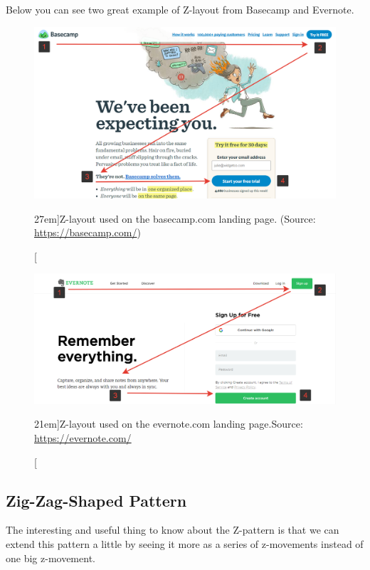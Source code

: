 	Below you can see two great example of Z-layout from Basecamp and Evernote.
	
\begin{figure}%
	\centering
  \includegraphics[width=1.5\textwidth]{../figures/z-shape_basecamp.png}
  \caption[][27em]{Z-layout used on the basecamp.com landing page. (Source: \url{https://basecamp.com/})}
  \label{fig:z-shape_facebook}
\end{figure}

\begin{figure}%
	\centering
  \includegraphics[width=1.5\textwidth]{../figures/z-shape_evernote.png}
  \caption[][21em]{Z-layout used on the evernote.com landing page.\newline Source: \url{https://evernote.com/}}
  \label{fig:z-shape_facebook}
\end{figure}

\subsection{Zig-Zag-Shaped Pattern} %
\label{sub:zig_zag_shaped_pattern}

The interesting and useful thing to know about the Z-pattern is that we can extend this pattern a little by seeing it more as a series of z-movements instead of one big z-movement.

